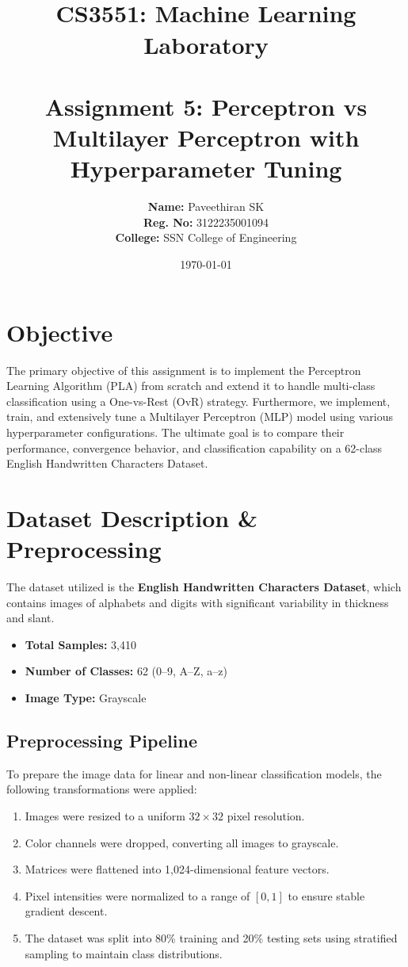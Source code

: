 \documentclass[12pt]{article}
\title{
    \vspace{-2cm}
    \hrulefill \\ \vspace{0.2cm}
    \textbf{\Large CS3551: Machine Learning Laboratory} \\ 
    \vspace{0.2cm} \hrulefill \\ \vspace{0.5cm}
    \Large Assignment 5: Perceptron vs Multilayer Perceptron with Hyperparameter Tuning
}
\author{
    \textbf{Name:} Paveethiran SK \\
    \textbf{Reg. No:} 3122235001094 \\
    \textbf{College:} SSN College of Engineering
}
\date{\today}
\begin{document}
\maketitle


\section{Objective}

The primary objective of this assignment is to implement the Perceptron Learning Algorithm (PLA) from scratch and extend it to handle multi-class classification using a One-vs-Rest (OvR) strategy. Furthermore, we implement, train, and extensively tune a Multilayer Perceptron (MLP) model using various hyperparameter configurations. The ultimate goal is to compare their performance, convergence behavior, and classification capability on a 62-class English Handwritten Characters Dataset.


\section{Dataset Description \& Preprocessing}

The dataset utilized is the \textbf{English Handwritten Characters Dataset}, which contains images of alphabets and digits with significant variability in thickness and slant.

\begin{itemize}
    \item \textbf{Total Samples:} 3,410
    \item \textbf{Number of Classes:} 62 (0--9, A--Z, a--z)
    \item \textbf{Image Type:} Grayscale
\end{itemize}

\subsection{Preprocessing Pipeline}

To prepare the image data for linear and non-linear classification models, the following transformations were applied:
\begin{enumerate}
    \item Images were resized to a uniform $32 \times 32$ pixel resolution.
    \item Color channels were dropped, converting all images to grayscale.
    \item Matrices were flattened into 1,024-dimensional feature vectors.
    \item Pixel intensities were normalized to a range of $[0, 1]$ to ensure stable gradient descent.
    \item The dataset was split into 80\% training and 20\% testing sets using stratified sampling to maintain class distributions.
\end{enumerate}
\end{document}
